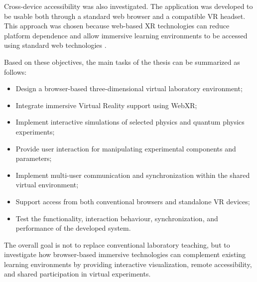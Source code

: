 Cross-device accessibility was also investigated. The application was developed to be usable both through a standard web browser and a compatible VR headset. This approach was chosen because web-based XR technologies can reduce platform dependence and allow immersive learning environments to be accessed using standard web technologies \cite{zatarain2022experiences}.

Based on these objectives, the main tasks of the thesis can be summarized as follows:

\begin{itemize}
    \item Design a browser-based three-dimensional virtual laboratory environment;
    \item Integrate immersive Virtual Reality support using WebXR;
    \item Implement interactive simulations of selected physics and quantum physics experiments;
    \item Provide user interaction for manipulating experimental components and parameters;
    \item Implement multi-user communication and synchronization within the shared virtual environment;
    \item Support access from both conventional browsers and standalone VR devices;
    \item Test the functionality, interaction behaviour, synchronization, and performance of the developed system.
\end{itemize}

The overall goal is not to replace conventional laboratory teaching, but to investigate how browser-based immersive technologies can complement existing learning environments by providing interactive visualization, remote accessibility, and shared participation in virtual experiments.



